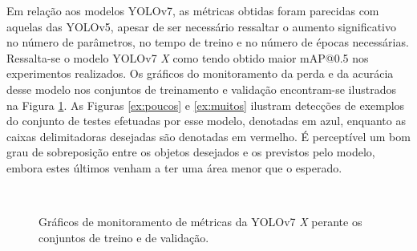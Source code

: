 Em relação aos modelos YOLOv7, as métricas obtidas foram parecidas com aquelas das YOLOv5, apesar de ser necessário ressaltar o aumento significativo no número de parâmetros, no tempo de treino e no número de épocas necessárias. Ressalta-se o modelo YOLOv7 \emph{X} como tendo obtido maior mAP@0.5 nos experimentos realizados. Os gráficos do monitoramento da perda e da acurácia desse modelo nos conjuntos de treinamento e validação encontram-se ilustrados na Figura \ref{fig:graph-train-val}. As Figuras \ref{ex:poucos} e \ref{ex:muitos} ilustram detecções de exemplos do conjunto de testes efetuadas por esse modelo, denotadas em azul, enquanto as caixas delimitadoras desejadas são denotadas em vermelho. É perceptível um bom grau de sobreposição entre os objetos desejados e os previstos pelo modelo, embora estes últimos venham a ter uma área menor que o esperado.


 \begin{figure}[h!]
 	\centering
 	 \\
 		\caption{Gráficos de monitoramento de métricas da YOLOv7 \emph{X} perante os conjuntos de treino e de validação.}  \label{fig:graph-train-val}
\end{figure}

